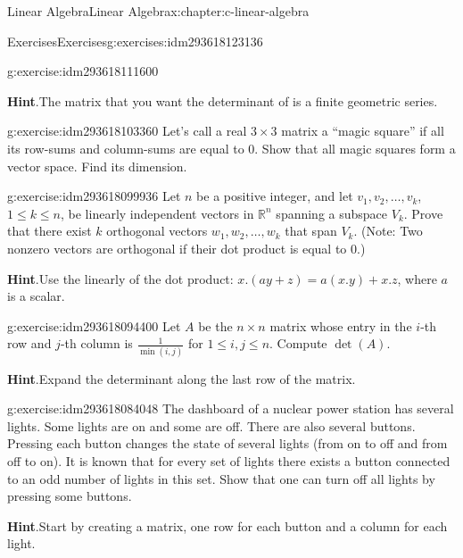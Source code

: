 \documentclass[twoside,10pt,]{book}
\newcommand{\blocktitlefont}{\relax}
\numberwithin{equation}{section}
\begin{document}
\begin{chapterptx}{Linear Algebra}{}{Linear Algebra}{}{}{x:chapter:c-linear-algebra}
\begin{exercises-section}{Exercises}{}{Exercises}{}{}{g:exercises:idm293618123136}
\begin{divisionexercise}{4}{}{}{g:exercise:idm293618111600}
\par\smallskip%
\noindent\textbf{\blocktitlefont Hint}.\label{g:hint:idm293618110768}{}\hypertarget{g:hint:idm293618110768}{}\quad{}The matrix that you want the determinant of is a finite geometric series.%
\end{divisionexercise}%
\begin{divisionexercise}{5}{}{}{g:exercise:idm293618103360}%
Let's call a real \(3 \times 3\) matrix a ``magic square'' if all its row-sums and column-sums are equal to 0. Show that all magic squares form a vector space. Find its dimension.%
\end{divisionexercise}%
\begin{divisionexercise}{6}{}{}{g:exercise:idm293618099936}%
Let \(n\) be a positive integer, and let \(v_1, v_2, \ldots ,v_k\), \(1\leq k\leq n\), be linearly independent vectors in \(\mathbb{R}^n\) spanning a subspace \(V_k\). Prove that there exist \(k\) orthogonal vectors \(w_1, w_2, \ldots ,w_k\) that span \(V_k\).  (Note: Two nonzero vectors are orthogonal if their dot product is equal to 0.)%
\par\smallskip%
\noindent\textbf{\blocktitlefont Hint}.\label{g:hint:idm293618099232}{}\hypertarget{g:hint:idm293618099232}{}\quad{}Use the linearly of the dot product: \(x.(a y+z) = a(x.y)+x.z\), where \(a\) is a scalar.%
\end{divisionexercise}%
\begin{divisionexercise}{7}{}{}{g:exercise:idm293618094400}%
Let \(A\) be the \(n\times n\) matrix whose entry in the \(i\)-th row and \(j\)-th column is \(\frac{1}{\min (i,j)}\) for \(1 \leq  i,j \leq  n\). Compute \(\det (A)\).%
\par\smallskip%
\noindent\textbf{\blocktitlefont Hint}.\label{g:hint:idm293618093408}{}\hypertarget{g:hint:idm293618093408}{}\quad{}Expand the determinant along the last row of the matrix.%
\end{divisionexercise}%
\begin{divisionexercise}{8}{}{}{g:exercise:idm293618084048}%
The dashboard of a nuclear power station has several lights. Some lights are on and some are off. There are also several buttons. Pressing each button changes the state of several lights (from on to off and from off to on). It is known that for every set of lights there exists a button connected to an odd number of lights in this set. Show that one can turn off all lights by pressing some buttons.%
\par\smallskip%
\noindent\textbf{\blocktitlefont Hint}.\label{g:hint:idm293618082560}{}\hypertarget{g:hint:idm293618082560}{}\quad{}Start by creating a matrix, one row for each button and a column for each light.%

\end{divisionexercise}
\end{exercises-section}
\end{chapterptx}
\end{document}
